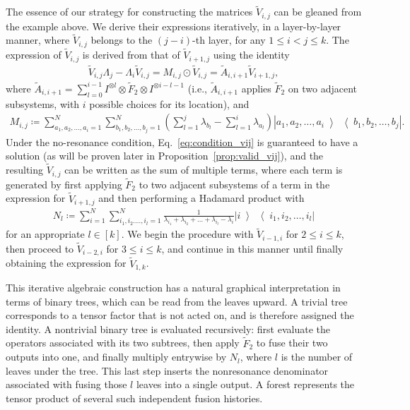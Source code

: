 \documentclass[superscriptaddress,onecolumn,nofootinbib,longbibliography,a4paper,accepted=2026-09-29]{quantumarticle}
\theoremstyle{plain}
\theoremstyle{definition}
\numberwithin{thm}{section}
\numberwithin{assumption}{section}
\numberwithin{lemma}{section}
\numberwithin{prop}{section}
\numberwithin{cor}{section}
\numberwithin{definition}{section}
\numberwithin{rmk}{section}
\numberwithin{equation}{section}
\newcommand{\ketbra}[2]   {\left|#1\middle\rangle\!\middle\langle#2\right|}
\newcommand{\lrb}[1]{\left ( #1 \right )}
\newcommand{\defeq}{\coloneqq}
\begin{document}
The essence of our strategy for constructing the matrices $\tilde{V}_{i,j}$ can be gleaned from the example above. We derive their expressions iteratively, in a layer-by-layer manner, where $\tilde{V}_{i, j}$ belongs to the $(j-i)$-th layer, for any $1\le i < j \le k$. The expression of $\tilde{V}_{i,j}$ is derived from that of $\tilde{V}_{i+1,j}$ using the identity
\begin{align}
    \tilde{V}_{i,j}\Lambda_j-\Lambda_i \tilde{V}_{i,j} = M_{i,j}\odot \tilde{V}_{i,j} =  \tilde{A}_{i,i+1} \tilde{V}_{i+1,j},    
\label{eq:condition_vij}
\end{align}
where $\tilde{A}_{i,i+1}=\sum_{l=0}^{i-1} I^{\otimes l} \otimes \tilde{F}_2 \otimes I^{\otimes i-l-1}$ (i.e., $\tilde{A}_{i,i+1}$ applies $\tilde{F}_2$ on two adjacent subsystems, with $i$ possible choices for its location), and
\begin{align}
    M_{i,j} \defeq \sum_{a_1,a_2,\dots,a_i=1}^N \sum_{b_1,b_2,\dots,b_j=1}^N \lrb{\sum_{l=1}^j \lambda_{b_l}-\sum_{l=1}^i \lambda_{a_l}} \ketbra{a_1,a_2,\dots,a_i}{b_1,b_2,\dots,b_j}.
\label{eq:def_mij}
\end{align}
Under the no-resonance condition, Eq.~\eqref{eq:condition_vij} is guaranteed to have a solution (as will be proven later in Proposition~\ref{prop:valid_vij}), 
and the resulting $\tilde{V}_{i,j}$ can be written as the sum of multiple terms, where each term is  generated by first applying $\tilde{F}_2$ to two adjacent subsystems of a term in the expression for $\tilde{V}_{i+1,j}$ and then performing a Hadamard product with 
\begin{align}
N_l \defeq \sum_{i=1}^N\sum_{i_1,i_2.\dots,i_l=1}^N \frac{1}{\lambda_{i_1}+\lambda_{i_2}+\dots+\lambda_{i_l}-\lambda_i} \ketbra{i}{i_1,i_2,\dots,i_l}    
\label{eq:def_nl}
\end{align}
for an appropriate $l \in [k]$. We begin the procedure with $\tilde{V}_{i-1,i}$ for $2 \le i \le k$, then proceed to 
 $\tilde{V}_{i-2,i}$ for $3 \le i \le k$, and continue in this manner until finally obtaining the expression for $\tilde{V}_{1,k}$. 

This iterative algebraic construction has a natural graphical interpretation in terms of binary trees, which can be read from the leaves upward. A trivial tree corresponds to a tensor factor that is not acted on, and is therefore assigned the identity. A nontrivial binary tree is evaluated recursively: first evaluate the operators associated with its two subtrees, then apply $\tilde F_2$ to fuse their two outputs into one, and finally multiply entrywise by $N_l$, where $l$ is the number of leaves under the tree. This last step inserts the nonresonance denominator associated with fusing those $l$ leaves into a single output. A forest represents the tensor product of several such independent fusion histories.
\end{document}
